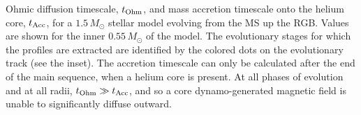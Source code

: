 \label{fig:timescales}
Ohmic diffusion timescale, $t_{\rm Ohm}$, and mass accretion timescale onto the helium core, $t_{\rm Acc}$, for a $1.5 \, M_\odot$ stellar model evolving from the MS up the RGB. Values are shown for the inner $0.55 \, M_\odot$ of the model. The evolutionary stages for which the profiles are extracted are identified by the colored dots on the evolutionary track (see the inset). The accretion timescale can only be calculated after the end of the main sequence, when a helium core is present. At all phases of evolution and at all radii, $t_{\rm Ohm} \gg t_{\rm Acc}$, and so a core dynamo-generated magnetic field is unable to significantly diffuse outward.
  